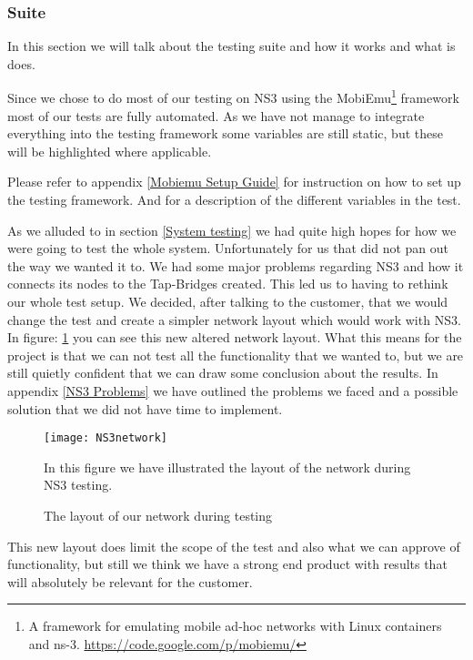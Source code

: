 \subsubsection{Suite}\label{Testing:About:Suite}
	In this section we will talk about the testing suite and how it works and what is does.
	
	Since we chose to do most of our testing on NS3 using the MobiEmu\footnote{A framework for emulating mobile ad-hoc networks with Linux containers and ns-3. \url{https://code.google.com/p/mobiemu/}} framework most of our tests are fully automated. As we have not manage to integrate everything into the testing framework some variables are still static, but these will be highlighted where applicable.

	\begin{shaded}
	Please refer to appendix \ref{Mobiemu Setup Guide} for instruction on how to set up the testing framework. And for a description of the different variables in the test.
	\end{shaded}
	
	As we alluded to in section \ref{System testing} we had quite high hopes for how we were going to test the whole system. Unfortunately for us that did not pan out the way we wanted it to. We had some major problems regarding NS3 and how it connects its nodes to the Tap-Bridges created. This led us to having to rethink our whole test setup. We decided, after talking to the customer, that we would change the test and create a simpler network layout which would work with NS3. In figure: \ref{fig:NS3network} you can see this new altered network layout. What this means for the project is that we can not test all the functionality that we wanted to, but we are still quietly confident that we can draw some conclusion about the results. In appendix \ref{NS3 Problems} we have outlined the problems we faced and a possible solution that we did not have time to implement.
	
	\begin{figure}[H]
        \centering
        \texttt{[image: NS3network]}
        \caption{The layout of our network during testing}
        In this figure we have illustrated the layout of the network during NS3 testing.
        \label{fig:NS3network}
    \end{figure}
    
    This new layout does limit the scope of the test and also what we can approve of functionality, but still we think we have a strong end product with results that will absolutely be relevant for the customer.
    
